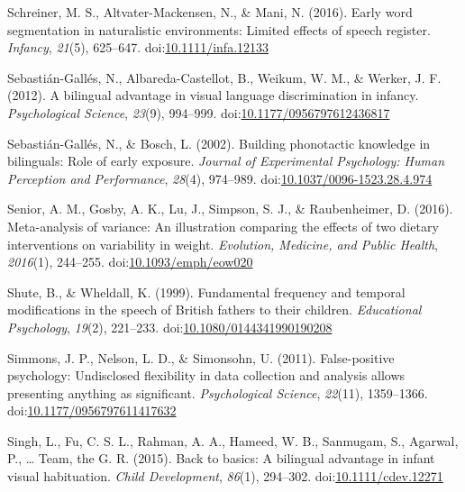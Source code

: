 \documentclass[,man,floatsintext]{apa6}
\begin{document}
\leavevmode\hypertarget{ref-schreiner_2016}{}%
Schreiner, M. S., Altvater-Mackensen, N., \& Mani, N. (2016). Early word segmentation in naturalistic environments: Limited effects of speech register. \emph{Infancy}, \emph{21}(5), 625--647. doi:\href{https://doi.org/10.1111/infa.12133}{10.1111/infa.12133}

\leavevmode\hypertarget{ref-sebastian_galles_2012}{}%
Sebastián-Gallés, N., Albareda-Castellot, B., Weikum, W. M., \& Werker, J. F. (2012). A bilingual advantage in visual language discrimination in infancy. \emph{Psychological Science}, \emph{23}(9), 994--999. doi:\href{https://doi.org/10.1177/0956797612436817}{10.1177/0956797612436817}

\leavevmode\hypertarget{ref-sebastian_galles_2002}{}%
Sebastián-Gallés, N., \& Bosch, L. (2002). Building phonotactic knowledge in bilinguals: Role of early exposure. \emph{Journal of Experimental Psychology: Human Perception and Performance}, \emph{28}(4), 974--989. doi:\href{https://doi.org/10.1037/0096-1523.28.4.974}{10.1037/0096-1523.28.4.974}

\leavevmode\hypertarget{ref-senior_2016}{}%
Senior, A. M., Gosby, A. K., Lu, J., Simpson, S. J., \& Raubenheimer, D. (2016). Meta-analysis of variance: An illustration comparing the effects of two dietary interventions on variability in weight. \emph{Evolution, Medicine, and Public Health}, \emph{2016}(1), 244--255. doi:\href{https://doi.org/10.1093/emph/eow020}{10.1093/emph/eow020}

\leavevmode\hypertarget{ref-shute_1999}{}%
Shute, B., \& Wheldall, K. (1999). Fundamental frequency and temporal modifications in the speech of British fathers to their children. \emph{Educational Psychology}, \emph{19}(2), 221--233. doi:\href{https://doi.org/10.1080/0144341990190208}{10.1080/0144341990190208}

\leavevmode\hypertarget{ref-simmons_2011}{}%
Simmons, J. P., Nelson, L. D., \& Simonsohn, U. (2011). False-positive psychology: Undisclosed flexibility in data collection and analysis allows presenting anything as significant. \emph{Psychological Science}, \emph{22}(11), 1359--1366. doi:\href{https://doi.org/10.1177/0956797611417632}{10.1177/0956797611417632}

\leavevmode\hypertarget{ref-singh_2015}{}%
Singh, L., Fu, C. S. L., Rahman, A. A., Hameed, W. B., Sanmugam, S., Agarwal, P., \ldots{} Team, the G. R. (2015). Back to basics: A bilingual advantage in infant visual habituation. \emph{Child Development}, \emph{86}(1), 294--302. doi:\href{https://doi.org/10.1111/cdev.12271}{10.1111/cdev.12271}
\end{document}
